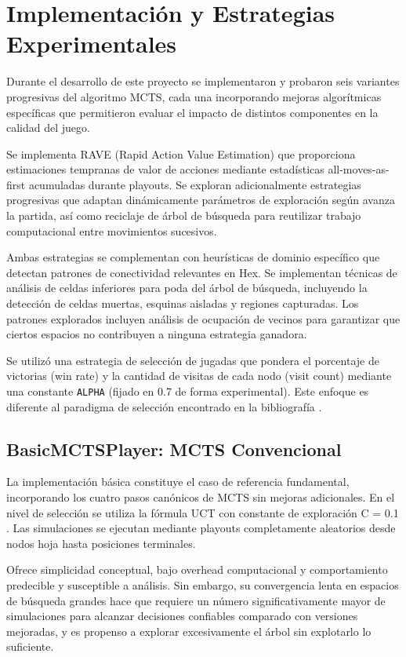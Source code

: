 \documentclass[12pt]{article}
\begin{document}
\section{Implementación y Estrategias Experimentales}

Durante el desarrollo de este proyecto se implementaron y probaron seis variantes progresivas del algoritmo MCTS, cada una incorporando mejoras algorítmicas específicas que permitieron evaluar el impacto de distintos componentes en la calidad del juego.

Se implementa RAVE (Rapid Action Value Estimation) que proporciona estimaciones tempranas de valor de acciones mediante estadísticas all-moves-as-first acumuladas durante playouts. Se exploran adicionalmente estrategias progresivas que adaptan dinámicamente parámetros de exploración según avanza la partida, así como reciclaje de árbol de búsqueda para reutilizar trabajo computacional entre movimientos sucesivos.

Ambas estrategias se complementan con heurísticas de dominio específico que detectan patrones de conectividad relevantes en Hex. Se implementan técnicas de análisis de celdas inferiores para poda del árbol de búsqueda, incluyendo la detección de celdas muertas, esquinas aisladas y regiones capturadas. Los patrones explorados incluyen análisis de ocupación de vecinos para garantizar que ciertos espacios no contribuyen a ninguna estrategia ganadora.

Se utilizó una estrategia de selección de jugadas que pondera el porcentaje de victorias (win rate) y la cantidad de visitas de cada nodo (visit count) mediante una constante \texttt{ALPHA} (fijado en 0.7 de forma experimental). Este enfoque es diferente al paradigma de selección encontrado en la bibliografía \cite{Russell2020}.

\subsection{BasicMCTSPlayer: MCTS Convencional}

La implementación básica constituye el caso de referencia fundamental, incorporando los cuatro pasos canónicos de MCTS sin mejoras adicionales. En el nivel de selección se utiliza la fórmula UCT con constante de exploración C = 0.1 \cite{Cazenave2009}. Las simulaciones se ejecutan mediante playouts completamente aleatorios desde nodos hoja hasta posiciones terminales. 

Ofrece simplicidad conceptual, bajo overhead computacional y comportamiento predecible y susceptible a análisis. Sin embargo, su convergencia lenta en espacios de búsqueda grandes hace que requiere un número significativamente mayor de simulaciones para alcanzar decisiones confiables comparado con versiones mejoradas, y es propenso a explorar excesivamente el árbol sin explotarlo lo suficiente.
\end{document}

